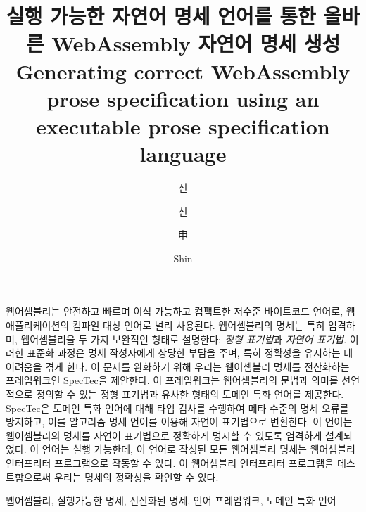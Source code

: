 \documentclass[master,english,draft]{kaist-ucs} %
\title[korean] {실행 가능한 자연어 명세 언어를 통한 올바른 WebAssembly 자연어 명세 생성}
\title[english]{Generating correct WebAssembly prose specification using an executable prose specification language}
\author[korean] {신}{원 호}
\author[korean2] {신}{원호}    %
\author[chinese]{申}{元 鎬}
\author[english]{Shin}{Wonho}
\begin{document}

 \thesisinfo
  \begin{summary}
  웹어셈블리는 안전하고 빠르며 이식 가능하고 컴팩트한 저수준 바이트코드
  언어로, 웹 애플리케이션의 컴파일 대상 언어로 널리 사용된다.
  웹어셈블리의 명세는 특히 엄격하며, 웹어셈블리을 두 가지 보완적인 형태로 설명한다:
  \textit{정형 표기법}과 \textit{자연어 표기법}.
  이러한 표준화 과정은 명세 작성자에게 상당한 부담을 주며, 특히 정확성을
  유지하는 데 어려움을 겪게 한다.
  이 문제를 완화하기 위해 우리는 웹어셈블리 명세를 전산화하는 프레임워크인 SpecTec을
  제안한다.
  이 프레임워크는 웹어셈블리의 문법과 의미를 선언적으로 정의할 수 있는 정형 표기법과
  유사한 형태의 도메인 특화 언어를 제공한다.
  SpecTec은 도메인 특화 언어에 대해 타입 검사를 수행하여 메타 수준의 명세 오류를 방지하고,
  이를 알고리즘 명세 언어를 이용해 자연어 표기법으로 변환한다.
  이 언어는 웹어셈블리의 명세를 자연어 표기법으로 정확하게 명시할 수 있도록 엄격하게
  설계되었다.
  이 언어는 실행 가능한데, 이 언어로 작성된 모든 웹어셈블리 명세는 웹어셈블리 인터프리터
  프로그램으로 작동할 수 있다.
  이 웹어셈블리 인터프리터 프로그램을 테스트함으로써 우리는 명세의 정확성을 확인할 수
  있다.
  \end{summary}

  \begin{Korkeyword}
  웹어셈블리, 실행가능한 명세, 전산화된 명세, 언어 프레임워크, 도메인 특화 언어
  \end{Korkeyword}
\end{document}
